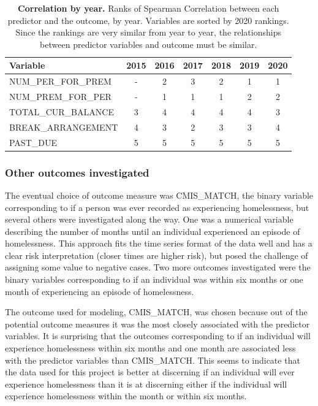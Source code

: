 \documentclass[10pt,letterpaper]{article}
\begin{document}
\begin{table}[!h]
    \centering
    \begin{tabular}{lcccccc}
        \toprule
                 Variable &  2015 &  2016 &  2017 &  2018 &  2019 &  2020 \\
        \midrule
        NUM\_PER\_FOR\_PREM &     - &     2 &     3 &     2 &     1 &     1 \\
        NUM\_PREM\_FOR\_PER &     - &     1 &     1 &     1 &     2 &     2 \\
        TOTAL\_CUR\_BALANCE &     3 &     4 &     4 &     4 &     4 &     3 \\
        BREAK\_ARRANGEMENT  &     4 &     3 &     2 &     3 &     3 &     4 \\
        PAST\_DUE           &     5 &     5 &     5 &     5 &     5 &     5 \\
        \bottomrule
    \end{tabular}
\caption{{\bf Correlation by year.} Ranks of Spearman Correlation between each predictor and the outcome, by year. Variables are sorted by 2020 rankings. Since the rankings are very similar from year to year, the relationships between predictor variables and outcome must be similar.}
\label{tbl:corr_years}
\end{table}

\subsubsection*{Other outcomes investigated}
The eventual choice of outcome measure was CMIS\_MATCH, the binary variable corresponding to if a person was ever recorded as experiencing homelessness, but several others were investigated along the way. One was a numerical variable describing the number of months until an individual experienced an episode of homelessness. This approach fits the time series format of the data well and has a clear risk interpretation (closer times are higher risk), but posed the challenge of assigning some value to negative cases. Two more outcomes investigated were the binary variables corresponding to if an individual was within six months or one month of experiencing an episode of homelessness.

The outcome used for modeling, CMIS\_MATCH, was chosen because out of the potential outcome measures it was the most closely associated with the predictor variables. It is surprising that the outcomes corresponding to if an individual will experience homelessness within six months and one month are associated less with the predictor variables than CMIS\_MATCH. This seems to indicate that the data used for this project is better at discerning if an individual will ever experience homelessness than it is at discerning either if the individual will experience homelessness within the month or within six months.
\end{document}
